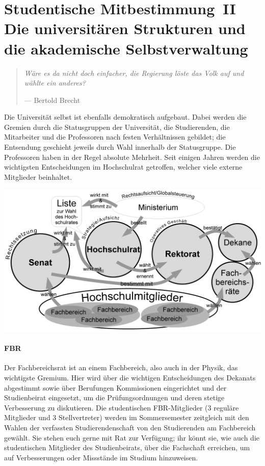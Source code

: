 \section*{Studentische Mitbestimmung~II\\Die universitären Strukturen und die akademische Selbstverwaltung}
\begin{multicols*}{2}
\begin{quote}
	\textit{Wäre es da nicht doch einfacher, die Regierung löste das Volk auf und wählte ein anderes?}

	\hfill--- Bertold Brecht
\end{quote}
Die Universität selbst ist ebenfalls demokratisch aufgebaut. Dabei werden die Gremien durch die Statusgruppen der Universität, die Studierenden, die Mitarbeiter und die Professoren nach festen Verhältnissen gebildet; die Entsendung geschieht jeweils durch Wahl innerhalb der Statusgruppe.
Die Professoren haben in der Regel absolute Mehrheit. Seit einigen Jahren werden die wichtigsten Entscheidungen im Hochschulrat getroffen, welcher viele externe Mitglieder beinhaltet.


\includegraphics[width=\columnwidth]{res/uni_strukturen.png}


\paragraph{FBR}
Der Fachbereichsrat ist an einem Fachbereich, also auch in der Physik, das wichtigste Gremium.
Hier wird über die wichtigen Entscheidungen des Dekanats abgestimmt sowie über Berufungen Kommissionen eingerichtet und der Studienbeirat eingesetzt, um die Prüfungsordnungen und deren stetige Verbesserung zu diskutieren.
Die studentischen FBR-Mitglieder (3 reguläre Mitglieder und 3 Stellvertreter) werden im Sommersemester zeitgleich mit den Wahlen der verfassten Studierendenschaft von den Studierenden am Fachbereich gewählt.
Sie stehen euch gerne mit Rat zur Verfügung; ihr könnt sie, wie auch die studentischen Mitglieder des Studienbeirats, über die Fachschaft erreichen, um auf Verbesserungen oder Missstände im Studium hinzuweisen.



\end{multicols*}
